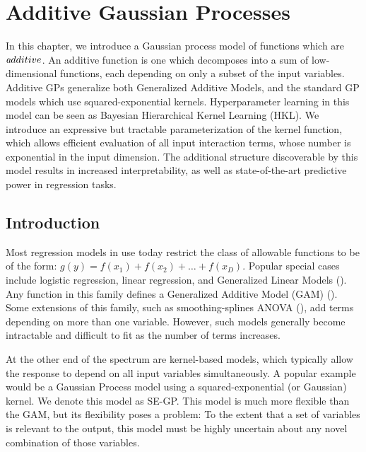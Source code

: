 
\inbpdocument

\newcommand{\additivefigsdir}{additive-figures}
\newcommand{\additivetablesdir}{additive-tables}

\chapter{Additive Gaussian Processes}
\label{ch:additive}

In this chapter, we introduce a Gaussian process model of functions which are $\textit additive$.  An additive function is one which decomposes into a sum of low-dimensional functions, each depending on only a subset of the input variables. Additive GPs generalize both Generalized Additive Models, and the standard GP models which use squared-exponential kernels.  Hyperparameter learning in this model can be seen as Bayesian Hierarchical Kernel Learning (HKL).  We introduce an expressive but tractable parameterization of the kernel function, which allows efficient evaluation of all input interaction terms, whose number is exponential in the input dimension.  The additional structure discoverable by this model results in increased interpretability, as well as state-of-the-art predictive power in regression tasks.

\section{Introduction}

Most regression models in use today restrict the class of allowable functions to be of the form: $g(y) = f(x_1) + f(x_2) + \dots + f(x_D)$.  Popular special cases include logistic regression, linear regression, and Generalized Linear Models (\cite{nelder1972generalized}).  Any function in this family defines a Generalized Additive Model (GAM) (\cite{hastie1990generalized}).   Some extensions of this family, such as smoothing-splines ANOVA (\cite{wahba1990spline}), add terms depending on more than one variable.  However, such models generally become intractable and difficult to fit as the number of terms increases.

At the other end of the spectrum are kernel-based models, which typically allow the response to depend on all input variables simultaneously.  A popular example would be a Gaussian Process model using a squared-exponential (or Gaussian) kernel.  We denote this model as SE-GP.  This model is much more flexible than the GAM, but its flexibility poses a problem:  To the extent that a set of variables is relevant to the output, this model must be highly uncertain about any novel combination of those variables.

